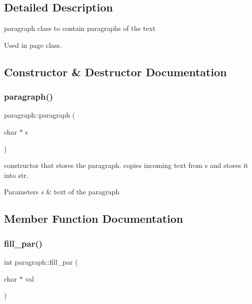 \subsection{Detailed Description}
paragraph class to contain paragraphs of the text 

Used in page class. 

\subsection{Constructor \& Destructor Documentation}
\mbox{\label{classparagraph_a7dafd3517c2c11bf597b54eace6ae92c}} 
\subsubsection{\texorpdfstring{paragraph()}{paragraph()}}
{\footnotesize\ttfamily paragraph\+::paragraph (\begin{DoxyParamCaption}\item[{char $\ast$}]{s }\end{DoxyParamCaption})\hspace{0.3cm}{\ttfamily [inline]}}

constructor that stores the paragraph. copies incoming text from s and stores it into str. 
\begin{DoxyParams}{Parameters}
{\em s} & text of the paragraph \\
\hline
\end{DoxyParams}


\subsection{Member Function Documentation}
\mbox{\label{classparagraph_a3be51295931921fa55765033675e45dd}} 
\subsubsection{\texorpdfstring{fill\+\_\+par()}{fill\_par()}}
{\footnotesize\ttfamily int paragraph\+::fill\+\_\+par (\begin{DoxyParamCaption}\item[{char $\ast$}]{val }\end{DoxyParamCaption})}

